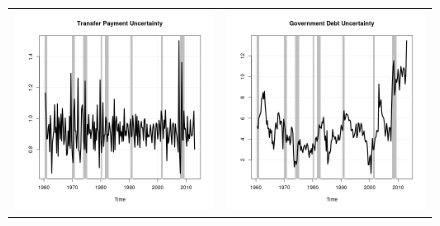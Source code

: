 \documentclass[11pt]{article}
\begin{document}
\begin{figure}
\begin{center}
\begin{tabular}{cc}
\includegraphics[scale=0.45]{./results/pics0.02/fpucoin_transfers.png} & \includegraphics[scale=0.45]{./results/pics0.02/fpucoin_debt.png}  
\end{tabular}
\end{center}
\end{figure} 
\end{document}
